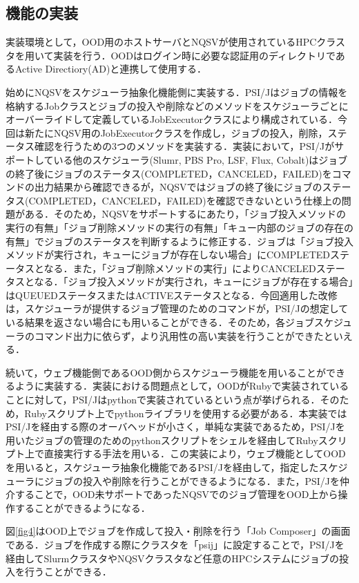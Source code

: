 \documentclass[a4paper,oneside,twocolumn,notitlepage,dvipdfmx]{jsarticle}
\begin{document}
\subsection{機能の実装}
実装環境として，OOD用のホストサーバとNQSVが使用されているHPCクラスタを用いて実装を行う．OODはログイン時に必要な認証用のディレクトリであるActive Directiory(AD)と連携して使用する．\par
始めにNQSVをスケジューラ抽象化機能側に実装する．PSI/Jはジョブの情報を格納するJobクラスとジョブの投入や削除などのメソッドをスケジューラごとにオーバーライドして定義しているJobExecutorクラスにより構成されている．今回は新たにNQSV用のJobExecutorクラスを作成し，ジョブの投入，削除，ステータス確認を行うための3つのメソッドを実装する．実装において，PSI/Jがサポートしている他のスケジューラ(Slumr, PBS Pro, LSF, Flux, Cobalt)はジョブの終了後にジョブのステータス(COMPLETED，CANCELED，FAILED)をコマンドの出力結果から確認できるが，NQSVではジョブの終了後にジョブのステータス(COMPLETED，CANCELED，FAILED)を確認できないという仕様上の問題がある．そのため，NQSVをサポートするにあたり，「ジョブ投入メソッドの実行の有無」「ジョブ削除メソッドの実行の有無」「キュー内部のジョブの存在の有無」でジョブのステータスを判断するように修正する．ジョブは「ジョブ投入メソッドが実行され，キューにジョブが存在しない場合」にCOMPLETEDステータスとなる．また，「ジョブ削除メソッドの実行」によりCANCELEDステータスとなる．「ジョブ投入メソッドが実行され，キューにジョブが存在する場合」はQUEUEDステータスまたはACTIVEステータスとなる．今回適用した改修は，スケジューラが提供するジョブ管理のためのコマンドが，PSI/Jの想定している結果を返さない場合にも用いることができる．そのため，各ジョブスケジューラのコマンド出力に依らず，より汎用性の高い実装を行うことができたといえる．\par
続いて，ウェブ機能側であるOOD側からスケジューラ機能を用いることができるように実装する．実装における問題点として，OODがRubyで実装されていることに対して，PSI/Jはpythonで実装されているという点が挙げられる．そのため，Rubyスクリプト上でpythonライブラリを使用する必要がある．本実装ではPSI/Jを経由する際のオーバヘッドが小さく，単純な実装であるため，PSI/Jを用いたジョブの管理のためのpythonスクリプトをシェルを経由してRubyスクリプト上で直接実行する手法を用いる．この実装により，ウェブ機能としてOODを用いると，スケジューラ抽象化機能であるPSI/Jを経由して，指定したスケジューラにジョブの投入や削除を行うことができるようになる．また，PSI/Jを仲介することで，OOD未サポートであったNQSVでのジョブ管理をOOD上から操作することができるようになる．\par
図\ref{fig4}はOOD上でジョブを作成して投入・削除を行う「Job Composer」の画面である．ジョブを作成する際にクラスタを「psij」に設定することで，PSI/Jを経由してSlurmクラスタやNQSVクラスタなど任意のHPCシステムにジョブの投入を行うことができる．\par
\end{document}
